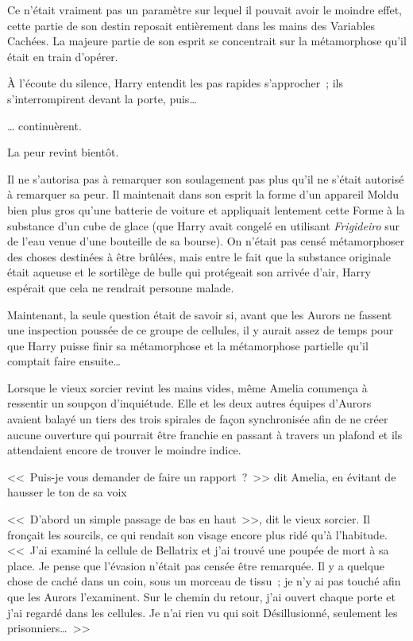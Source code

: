 Ce n'était vraiment pas un paramètre sur lequel il pouvait avoir le moindre effet, cette partie de son destin reposait entièrement dans les mains des Variables Cachées. La majeure partie de son esprit se concentrait sur la métamorphose qu'il était en train d'opérer.

À l'écoute du silence, Harry entendit les pas rapides s'approcher~; ils s'interrompirent devant la porte, puis…

… continuèrent.

La peur revint bientôt.

Il ne s'autorisa pas à remarquer son soulagement pas plus qu'il ne s'était autorisé à remarquer sa peur. Il maintenait dans son esprit la forme d'un appareil Moldu bien plus gros qu'une batterie de voiture et appliquait lentement cette Forme à la substance d'un cube de glace (que Harry avait congelé en utilisant \emph{Frigideiro} sur de l'eau venue d'une bouteille de sa bourse). On n'était pas censé métamorphoser des choses destinées à être brûlées, mais entre le fait que la substance originale était aqueuse et le sortilège de bulle qui protégeait son arrivée d'air, Harry espérait que cela ne rendrait personne malade.

Maintenant, la seule question était de savoir si, avant que les Aurors ne fassent une inspection poussée de ce groupe de cellules, il y aurait assez de temps pour que Harry puisse finir sa métamorphose et la métamorphose partielle qu'il comptait faire ensuite…

\later

Lorsque le vieux sorcier revint les mains vides, même Amelia commença à ressentir un soupçon d'inquiétude. Elle et les deux autres équipes d'Aurors avaient balayé un tiers des trois spirales de façon synchronisée afin de ne créer aucune ouverture qui pourrait être franchie en passant à travers un plafond et ils attendaient encore de trouver le moindre indice.

<<~Puis-je vous demander de faire un rapport~?~>> dit Amelia, en évitant de hausser le ton de sa voix

<<~D'abord un simple passage de bas en haut~>>, dit le vieux sorcier. Il fronçait les sourcils, ce qui rendait son visage encore plus ridé qu'à l'habitude. <<~J'ai examiné la cellule de Bellatrix et j'ai trouvé une poupée de mort à sa place. Je pense que l'évasion n'était pas censée être remarquée. Il y a quelque chose de caché dans un coin, sous un morceau de tissu~; je n'y ai pas touché afin que les Aurors l'examinent. Sur le chemin du retour, j'ai ouvert chaque porte et j'ai regardé dans les cellules. Je n'ai rien vu qui soit Désillusionné, seulement les prisonniers…~>>

